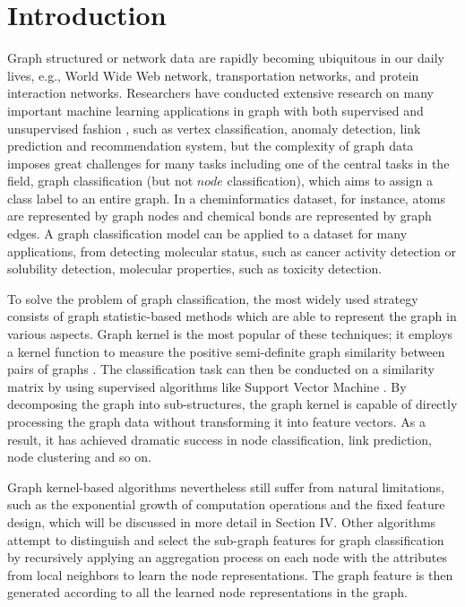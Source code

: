 \documentclass[conference]{IEEEtran}
\begin{document}
	
	\section{Introduction}

	     \par Graph structured or network data are rapidly becoming ubiquitous in our daily lives, e.g., World Wide Web network, transportation networks, and protein interaction networks. Researchers have conducted extensive research on many important machine learning applications in graph with both supervised and unsupervised fashion \cite{bacciu2018contextual}, such as vertex classification\cite{chuang1990three}, anomaly detection\cite{noble2003graph}, link prediction\cite{li2018diffusion} and recommendation system\cite{fouss2007random}, but the complexity of graph data imposes great challenges for many tasks including one of the central tasks in the field, graph classification (but not $node$ classification), which aims to assign a class label to an entire graph. In a cheminformatics dataset, for instance, atoms are represented by graph nodes and chemical bonds are represented by graph edges. A graph classification model can be applied to a dataset for many applications, from detecting molecular status, such as cancer activity detection or solubility detection, molecular properties, such as toxicity detection.
	   
	     To solve the problem of graph classification, the most widely used strategy consists of graph statistic-based methods which are able to represent the graph in various aspects. Graph kernel\cite{vishwanathan2010graph,shervashidze2011weisfeiler} is the most popular of these techniques; it employs a kernel function to measure the positive semi-definite graph similarity between pairs of graphs \cite{shervashidze2009efficient}. The classification task can then be conducted on a similarity matrix by using supervised algorithms like Support Vector Machine \cite{cortes1995support}. By decomposing the graph into sub-structures, the graph kernel is capable of directly processing the graph data without transforming it into feature vectors. As a result, it has achieved dramatic success in node classification, link prediction, node clustering and so on.
	   
	     Graph kernel-based algorithms nevertheless still suffer from natural limitations, such as the exponential growth of computation operations and the fixed feature design, which will be discussed in more detail in Section IV. 
	     Other algorithms \cite{pan2016joint} attempt to distinguish and select the sub-graph features for graph classification by recursively applying an aggregation process on each node with the attributes from local neighbors to learn the node representations. The graph feature is then generated according to all the learned node representations in the graph.
\end{document}
